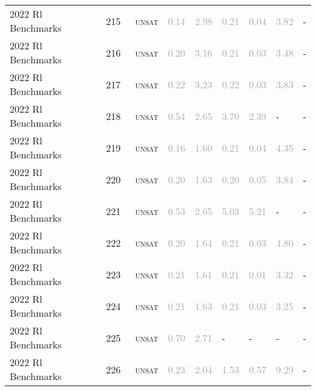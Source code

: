 \begin{center}
{\begin{longtable}{@{}lllllllll@{}}
2022 Rl Benchmarks & 215 & ~\textsc{unsat} & \textcolor{darkgray}{0.14} & \textcolor{darkgray}{2.98} & \textcolor{darkgray}{0.21} & \textcolor{darkgray}{0.04} & \textcolor{darkgray}{3.82} & - \\
2022 Rl Benchmarks & 216 & ~\textsc{unsat} & \textcolor{darkgray}{0.20} & \textcolor{darkgray}{3.16} & \textcolor{darkgray}{0.21} & \textcolor{darkgray}{0.03} & \textcolor{darkgray}{3.48} & - \\
2022 Rl Benchmarks & 217 & ~\textsc{unsat} & \textcolor{darkgray}{0.22} & \textcolor{darkgray}{3.23} & \textcolor{darkgray}{0.22} & \textcolor{darkgray}{0.03} & \textcolor{darkgray}{3.83} & - \\
2022 Rl Benchmarks & 218 & ~\textsc{unsat} & \textcolor{darkgray}{0.54} & \textcolor{darkgray}{2.65} & \textcolor{darkgray}{3.70} & \textcolor{darkgray}{2.39} & - & - \\
2022 Rl Benchmarks & 219 & ~\textsc{unsat} & \textcolor{darkgray}{0.16} & \textcolor{darkgray}{1.60} & \textcolor{darkgray}{0.21} & \textcolor{darkgray}{0.04} & \textcolor{darkgray}{4.35} & - \\
2022 Rl Benchmarks & 220 & ~\textsc{unsat} & \textcolor{darkgray}{0.20} & \textcolor{darkgray}{1.63} & \textcolor{darkgray}{0.20} & \textcolor{darkgray}{0.05} & \textcolor{darkgray}{3.84} & - \\
2022 Rl Benchmarks & 221 & ~\textsc{unsat} & \textcolor{darkgray}{0.53} & \textcolor{darkgray}{2.65} & \textcolor{darkgray}{5.03} & \textcolor{darkgray}{5.21} & - & - \\
2022 Rl Benchmarks & 222 & ~\textsc{unsat} & \textcolor{darkgray}{0.20} & \textcolor{darkgray}{1.64} & \textcolor{darkgray}{0.21} & \textcolor{darkgray}{0.03} & \textcolor{darkgray}{4.80} & - \\
2022 Rl Benchmarks & 223 & ~\textsc{unsat} & \textcolor{darkgray}{0.21} & \textcolor{darkgray}{1.61} & \textcolor{darkgray}{0.21} & \textcolor{darkgray}{0.01} & \textcolor{darkgray}{3.32} & - \\
2022 Rl Benchmarks & 224 & ~\textsc{unsat} & \textcolor{darkgray}{0.21} & \textcolor{darkgray}{1.63} & \textcolor{darkgray}{0.21} & \textcolor{darkgray}{0.03} & \textcolor{darkgray}{3.25} & - \\
2022 Rl Benchmarks & 225 & ~\textsc{unsat} & \textcolor{darkgray}{0.70} & \textcolor{darkgray}{2.71} & - & - & - & - \\
2022 Rl Benchmarks & 226 & ~\textsc{unsat} & \textcolor{darkgray}{0.23} & \textcolor{darkgray}{2.04} & \textcolor{darkgray}{1.53} & \textcolor{darkgray}{0.57} & \textcolor{darkgray}{9.29} & - \\

\end{longtable}}
\end{center}
